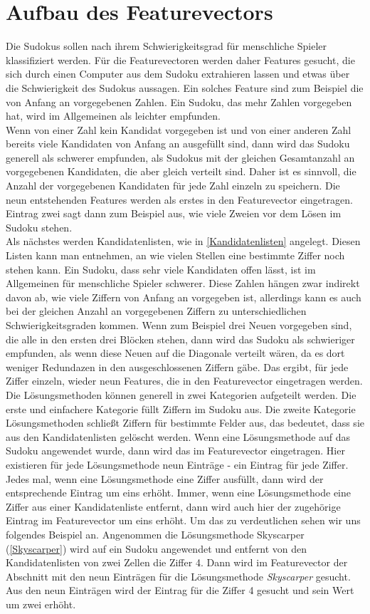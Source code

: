 \section{Aufbau des Featurevectors}
\label{Aufbau}
Die Sudokus sollen nach ihrem Schwierigkeitsgrad für menschliche Spieler klassifiziert werden. Für die Featurevectoren werden daher Features gesucht, die sich durch einen Computer aus dem Sudoku extrahieren lassen und etwas über die Schwierigkeit des Sudokus aussagen. Ein solches Feature sind zum Beispiel die von Anfang an vorgegebenen Zahlen. Ein Sudoku, das mehr Zahlen vorgegeben hat, wird im Allgemeinen als leichter empfunden.\\
Wenn von einer Zahl kein Kandidat vorgegeben ist und von einer anderen Zahl bereits viele Kandidaten von Anfang an ausgefüllt sind, dann wird das Sudoku generell als schwerer empfunden, als Sudokus mit der gleichen Gesamtanzahl an vorgegebenen Kandidaten, die aber gleich verteilt sind. Daher ist es sinnvoll, die Anzahl der vorgegebenen Kandidaten für jede Zahl einzeln zu speichern. Die neun entstehenden Features werden als erstes in den Featurevector eingetragen. Eintrag zwei sagt dann zum Beispiel aus, wie viele Zweien vor dem Lösen im Sudoku stehen.\\
Als nächstes werden Kandidatenlisten, wie in \ref{Kandidatenlisten} angelegt. Diesen Listen kann man entnehmen, an wie vielen Stellen eine bestimmte Ziffer noch stehen kann. Ein Sudoku, dass sehr viele Kandidaten offen lässt, ist im Allgemeinen für menschliche Spieler schwerer. Diese Zahlen hängen zwar indirekt davon ab, wie viele Ziffern von Anfang an vorgegeben ist, allerdings kann es auch bei der gleichen Anzahl an vorgegebenen Ziffern zu unterschiedlichen Schwierigkeitsgraden kommen. Wenn zum Beispiel drei Neuen vorgegeben sind, die alle in den ersten drei Blöcken stehen, dann wird das Sudoku als schwieriger empfunden, als wenn diese Neuen auf die Diagonale verteilt wären, da es dort weniger Redundazen in den ausgeschlossenen Ziffern gäbe. Das ergibt, für jede Ziffer einzeln, wieder neun Features, die in den Featurevector eingetragen werden.\\
Die Lösungsmethoden können generell in zwei Kategorien aufgeteilt werden. Die erste und einfachere Kategorie füllt Ziffern im Sudoku aus. Die zweite Kategorie Lösungsmethoden schließt Ziffern für bestimmte Felder aus, das bedeutet, dass sie aus den Kandidatenlisten gelöscht werden. Wenn eine Lösungsmethode auf das Sudoku angewendet wurde, dann wird das im Featurevector eingetragen. Hier existieren für jede Lösungsmethode neun Einträge - ein Eintrag für jede Ziffer. Jedes mal, wenn eine Lösungsmethode eine Ziffer ausfüllt, dann wird der entsprechende Eintrag um eins erhöht. Immer, wenn eine Lösungsmethode eine Ziffer aus einer Kandidatenliste entfernt, dann wird auch hier der zugehörige Eintrag im Featurevector um eins erhöht. Um das zu verdeutlichen sehen wir uns folgendes Beispiel an. Angenommen die Lösungsmethode Skyscarper (\ref{Skyscarper}) wird auf ein Sudoku angewendet und entfernt von den Kandidatenlisten von zwei Zellen die Ziffer 4. Dann wird im Featurevector der Abschnitt mit den neun Einträgen für die Lösungsmethode \textit{Skyscarper} gesucht. Aus den neun Einträgen wird der Eintrag für die Ziffer 4 gesucht und sein Wert um zwei erhöht.\\
